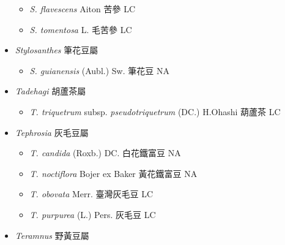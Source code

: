 \begin{itemize}
  \begin{itemize}
        \item[] \textit{S. flavescens} Aiton  苦參   LC
        \item[] \textit{S. tomentosa} L.  毛苦參   LC
  \end{itemize}
 \item[] \textit{Stylosanthes} 筆花豆屬
                                
  \begin{itemize}
        \item[] \textit{S. guianensis} (Aubl.) Sw.  筆花豆   NA
  \end{itemize}
 \item[] \textit{Tadehagi} 胡蘆茶屬
                                
  \begin{itemize}
        \item[] \textit{T. triquetrum} subsp. \textit{pseudotriquetrum} (DC.) H.Ohashi  葫蘆茶   LC
  \end{itemize}
 \item[] \textit{Tephrosia} 灰毛豆屬
                                
  \begin{itemize}
        \item[] \textit{T. candida} (Roxb.) DC.  白花鐵富豆   NA
        \item[] \textit{T. noctiflora} Bojer ex Baker  黃花鐵富豆   NA
        \item[] \textit{T. obovata} Merr.  臺灣灰毛豆   LC
        \item[] \textit{T. purpurea} (L.) Pers.  灰毛豆   LC
  \end{itemize}
 \item[] \textit{Teramnus} 野黃豆屬
                                

\end{itemize}
